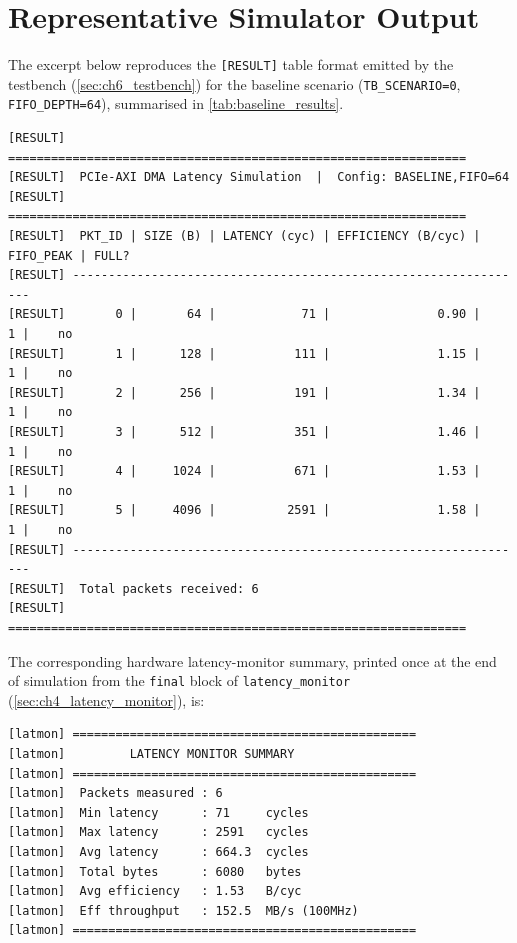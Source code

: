 \section{Representative Simulator Output}
\label{sec:appA_output}

The excerpt below reproduces the \texttt{[RESULT]} table format emitted by the testbench (\autoref{sec:ch6_testbench}) for the baseline scenario (\texttt{TB\_SCENARIO=0}, \texttt{FIFO\_DEPTH=64}), summarised in \autoref{tab:baseline_results}.

\begin{verbatim}
[RESULT] ================================================================
[RESULT]  PCIe-AXI DMA Latency Simulation  |  Config: BASELINE,FIFO=64
[RESULT] ================================================================
[RESULT]  PKT_ID | SIZE (B) | LATENCY (cyc) | EFFICIENCY (B/cyc) | FIFO_PEAK | FULL?
[RESULT] ----------------------------------------------------------------
[RESULT]       0 |       64 |            71 |               0.90 |         1 |    no
[RESULT]       1 |      128 |           111 |               1.15 |         1 |    no
[RESULT]       2 |      256 |           191 |               1.34 |         1 |    no
[RESULT]       3 |      512 |           351 |               1.46 |         1 |    no
[RESULT]       4 |     1024 |           671 |               1.53 |         1 |    no
[RESULT]       5 |     4096 |          2591 |               1.58 |         1 |    no
[RESULT] ----------------------------------------------------------------
[RESULT]  Total packets received: 6
[RESULT] ================================================================
\end{verbatim}

The corresponding hardware latency-monitor summary, printed once at the end of simulation from the \texttt{final} block of \texttt{latency\_monitor} (\autoref{sec:ch4_latency_monitor}), is:

\begin{verbatim}
[latmon] ================================================
[latmon]         LATENCY MONITOR SUMMARY
[latmon] ================================================
[latmon]  Packets measured : 6
[latmon]  Min latency      : 71     cycles
[latmon]  Max latency      : 2591   cycles
[latmon]  Avg latency      : 664.3  cycles
[latmon]  Total bytes      : 6080   bytes
[latmon]  Avg efficiency   : 1.53   B/cyc
[latmon]  Eff throughput   : 152.5  MB/s (100MHz)
[latmon] ================================================
\end{verbatim}
